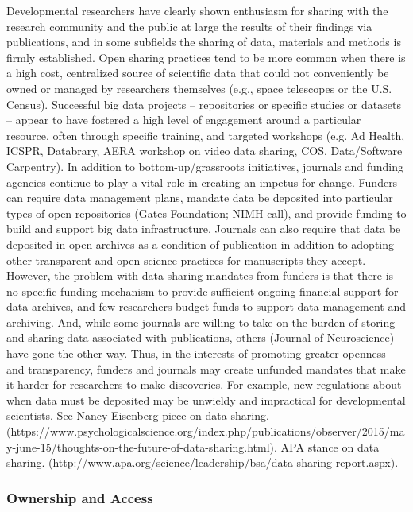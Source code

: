 \documentclass[letterpaper,man,apacite]{apa6}
\begin{document}
Developmental researchers have clearly shown enthusiasm for sharing with the research community and the public at large the results of their findings via publications, and in some subfields the sharing of data, materials and methods is firmly established.
Open sharing practices tend to be more common when there is a high cost, centralized source of scientific data that could not conveniently be owned or managed by researchers themselves (e.g., space telescopes or the U.S. Census).
Successful big data projects -- repositories or specific studies or datasets -- appear to have fostered a high level of engagement around a particular resource, often through specific training, and targeted workshops (e.g. Ad Health, ICSPR, Databrary, AERA workshop on video data sharing, COS, Data/Software Carpentry).
In addition to bottom-up/grassroots initiatives, journals and funding agencies continue to play a vital role in creating an impetus for change.
Funders can require data management plans, mandate data be deposited into particular types of open repositories (Gates Foundation; NIMH call), and provide funding to build and support big data infrastructure.
Journals can also require that data be deposited in open archives as a condition of publication in addition to adopting other transparent and open science practices for manuscripts they accept.
However, the problem with data sharing mandates from funders is that there is no specific funding mechanism to provide sufficient ongoing financial support for data archives, and few researchers budget funds to support data management and archiving.
And, while some journals are willing to take on the burden of storing and sharing data associated with publications, others (Journal of Neuroscience) have gone the other way.
Thus, in the interests of promoting greater openness and transparency, funders and journals may create unfunded mandates that make it harder for researchers to make discoveries.
For example, new regulations about when data must be deposited may be unwieldy and impractical for developmental scientists. 
See Nancy Eisenberg piece on data sharing. (https://www.psychologicalscience.org/index.php/publications/observer/2015/may-june-15/thoughts-on-the-future-of-data-sharing.html).
APA stance on data sharing. (http://www.apa.org/science/leadership/bsa/data-sharing-report.aspx).

\subsubsection{Ownership and Access}
\end{document}
